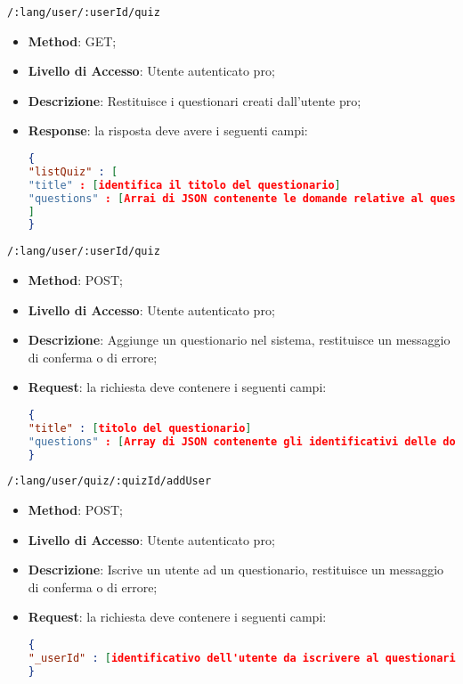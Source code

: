 \item \texttt{/:lang/user/:userId/quiz}
	\begin{itemize}
		\item \textbf{Method}: GET;
		\item \textbf{Livello di Accesso}: Utente autenticato pro;
		\item \textbf{Descrizione}: Restituisce i questionari creati dall'utente pro;
		\item \textbf{Response}: la risposta deve avere i seguenti campi:
\begin{lstlisting}[language=json,firstnumber=1]
{
"listQuiz" : [ 
"title" : [identifica il titolo del questionario]
"questions" : [Arrai di JSON contenente le domande relative al questionario]
]
}
\end{lstlisting}
	\end{itemize}	
	
	
	\item \texttt{/:lang/user/:userId/quiz}
		\begin{itemize}
			\item \textbf{Method}: POST;
			\item \textbf{Livello di Accesso}: Utente autenticato pro;
			\item \textbf{Descrizione}: Aggiunge un questionario nel sistema, restituisce un messaggio di conferma o di errore;
			\item \textbf{Request}: la richiesta deve contenere i seguenti campi:
\begin{lstlisting}[language=json,firstnumber=1]
{
"title" : [titolo del questionario]
"questions" : [Array di JSON contenente gli identificativi delle domande che compongono il questionario]
}
\end{lstlisting}
		\end{itemize}
		
		
	\item \texttt{/:lang/user/quiz/:quizId/addUser}
	\begin{itemize}
		\item \textbf{Method}: POST;
		\item \textbf{Livello di Accesso}: Utente autenticato pro;
		\item \textbf{Descrizione}: Iscrive un utente ad un questionario, restituisce un messaggio di conferma o di errore;
		\item \textbf{Request}: la richiesta deve contenere i seguenti campi:
\begin{lstlisting}[language=json,firstnumber=1]
{
"_userId" : [identificativo dell'utente da iscrivere al questionario]
}
\end{lstlisting}
	\end{itemize}
	
